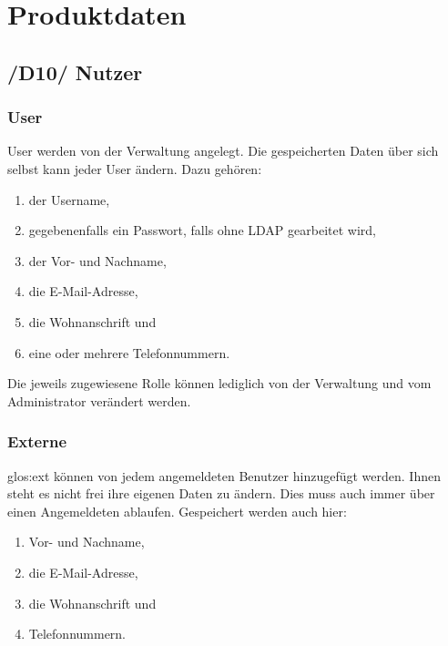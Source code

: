 
\chapter{Produktdaten}

\section{/D10/ Nutzer}
\subsection{User}
User werden von der Verwaltung angelegt. Die gespeicherten Daten über sich selbst kann jeder User ändern. Dazu gehören: 
\begin{enumerate}
	\item der Username, 
	\item gegebenenfalls ein Passwort, falls ohne \gls{LDAP} gearbeitet wird,
	\item der Vor- und Nachname, 
	\item die E-Mail-Adresse, 
	\item die Wohnanschrift und 
	\item eine oder mehrere Telefonnummern. 
\end{enumerate} 
Die jeweils zugewiesene Rolle können lediglich von der Verwaltung und vom Administrator verändert werden.

\subsection{Externe}
\gls{glos:ext} können von jedem angemeldeten Benutzer hinzugefügt werden. Ihnen steht es nicht frei ihre eigenen Daten zu ändern. Dies muss auch immer über einen Angemeldeten ablaufen. Gespeichert werden auch hier: 
\begin{enumerate}
	\item Vor- und Nachname, 
	\item die E-Mail-Adresse, 
	\item die Wohnanschrift und 
	\item Telefonnummern.
\end{enumerate}

